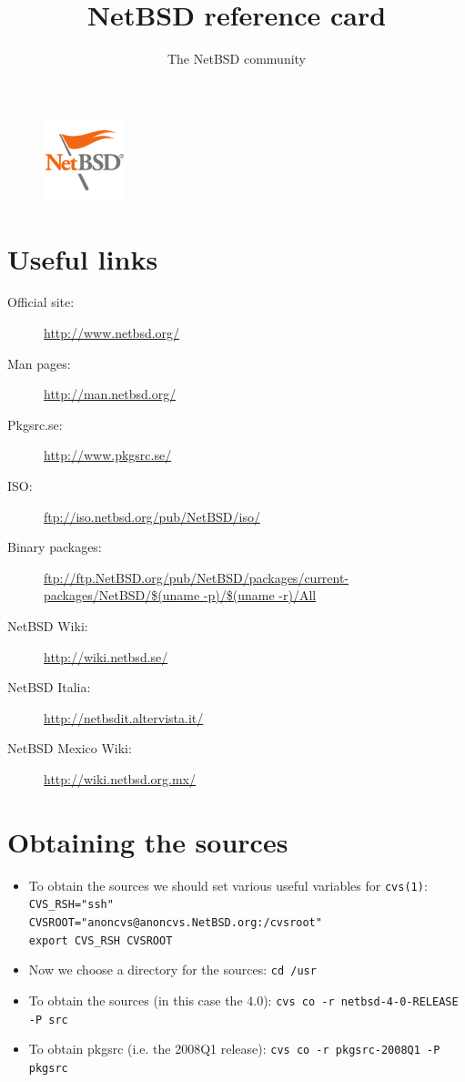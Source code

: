 \documentclass[notumble]{leaflet}
\title{NetBSD reference card}
\author{The NetBSD community}
\date{}
\newcommand{\man}[1]{\mbox{\texttt{#1}}}
\begin{document}
\begin{figure}
\centering
\includegraphics{imgs/NetBSD-flag.png}
\end{figure}

\maketitle
\thispagestyle{empty}

\section{Useful links}
\begin{description}
\item[Official site:] \url{http://www.netbsd.org/}
\item[Man pages:] \url{http://man.netbsd.org/}
\item[Pkgsrc.se:] \url{http://www.pkgsrc.se/}
\item[ISO:] \url{ftp://iso.netbsd.org/pub/NetBSD/iso/}
\item[Binary packages:] \url{ftp://ftp.NetBSD.org/pub/NetBSD/packages/current-packages/NetBSD/$(uname -p)/$(uname -r)/All}
\item[NetBSD Wiki:] \url{http://wiki.netbsd.se/}
\item[NetBSD Italia:] \url{http://netbsdit.altervista.it/}
\item[NetBSD Mexico Wiki:] \url{http://wiki.netbsd.org.mx/}
\end{description}


\section{Obtaining the sources}
\begin{itemize}
\item To obtain the sources we should set various useful variables for
\man{cvs(1)}:
\verb|CVS_RSH="ssh"| \\
\verb|CVSROOT="anoncvs@anoncvs.NetBSD.org:/cvsroot"| \\
\verb|export CVS_RSH CVSROOT|
\item Now we choose a directory for the sources:
\verb|cd /usr|
\item To obtain the sources (in this case the 4.0):
\verb|cvs co -r netbsd-4-0-RELEASE -P src|
\item To obtain pkgsrc (i.e. the 2008Q1 release):
\verb|cvs co -r pkgsrc-2008Q1 -P pkgsrc|
\end{itemize}
\end{document}
